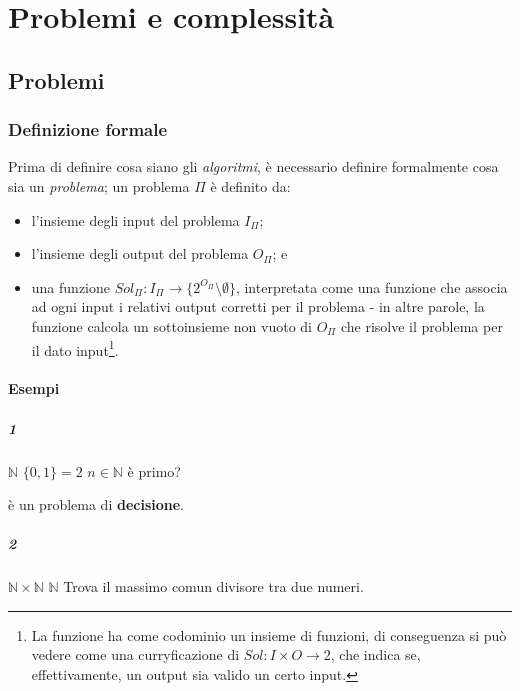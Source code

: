 \chapter{Problemi e complessità}

\section{Problemi}

\subsection{Definizione formale}
Prima di definire cosa siano gli \textit{algoritmi}, è necessario definire
formalmente cosa sia un \textit{problema}; un problema $\Pi$ è definito da:
\begin{itemize}
	\setlength\itemsep{0pt}
	\item l'insieme degli input del problema $I_{\Pi}$;
	\item l'insieme degli output del problema $O_{\Pi}$; e
	\item una funzione $Sol_{\Pi}: I_{\Pi} \rightarrow \{2^{O_{\Pi}} \setminus \emptyset\}$,
	      interpretata come una funzione che associa ad ogni input i relativi
	      output corretti per il problema - in altre parole, la funzione calcola
	      un sottoinsieme non vuoto di $O_{\Pi}$ che risolve il problema per il dato input\footnote{
		      La funzione ha come codominio un insieme di funzioni, di conseguenza
		      si può vedere come una curryficazione di $Sol: I \times O \rightarrow 2$, che indica se,
		      effettivamente, un output sia valido un certo input.}.

\end{itemize}

\subsubsection{Esempi}
\paragraph{1}
 {$\mathbb{N}$} {$\{0, 1\} = 2$} {$n \in \mathbb{N}$ è primo?}

è un problema di \textbf{decisione}.

\paragraph{2}
 {$\mathbb{N}\times\mathbb{N}$} {$\mathbb{N}$}
{Trova il massimo comun divisore tra due numeri.}

